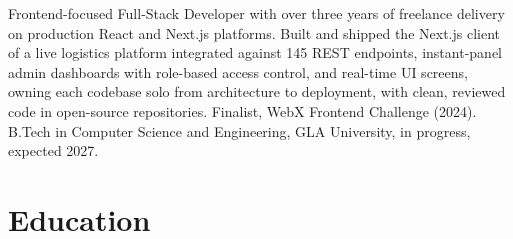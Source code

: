 \documentclass[11pt,a4paper,sans]{moderncv}
\begin{document}
\makecvtitle


\vspace{4pt}
\small{Frontend-focused Full-Stack Developer with over three years of freelance delivery on production React and Next.js platforms. Built and shipped the Next.js client of a live logistics platform integrated against 145 REST endpoints, instant-panel admin dashboards with role-based access control, and real-time UI screens, owning each codebase solo from architecture to deployment, with clean, reviewed code in open-source repositories. Finalist, WebX Frontend Challenge (2024). B.Tech in Computer Science and Engineering, GLA University, in progress, expected 2027.}


\section{Education}
\vspace{1pt}

\end{document}
